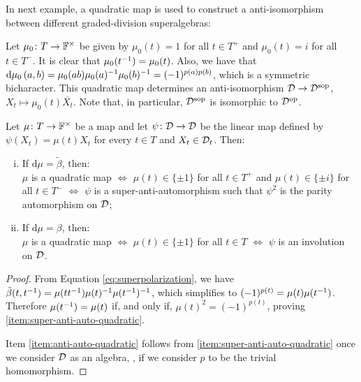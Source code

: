 In next example, a quadratic map is used to construct a anti-isomorphism between different graded-division superalgebras:

\begin{ex}\label{ex:quadratic-form-polarization-parity}
	Let $\mu_0\colon T \to \mathbb{F}^\times$ be given by $\mu_0(t) = 1$ for all $t\in T^+$ and $\mu_0(t) = i$ for all $t\in T^-$.
	It is clear that $\mu_0(t^{-1}) = \mu_0(t)$.
	Also, we have that $\mathrm{d}\mu_0 \, (a,b) = \mu_0(ab) \mu_0(a)^{-1} \mu_0(b)^{-1} = (-1)^{p(a)p(b)}$, which is a symmetric bicharacter. 
	This quadratic map determines an anti-isomorphism $\mathcal{D} \to \mathcal{D}^{\mathrm{sop}}$, $X_t\mapsto \mu_0(t)\overline{X_t}$. 
	Note that, in particular, $\mathcal{D}^{\mathrm{sop}}$ is isomorphic to $\mathcal{D}^{\mathrm{op}}$.
\end{ex}

\begin{lemma}\label{lemma:quadratic-form-involutions}
	Let $\mu\colon T \to \mathbb{F}^\times$ be a map and let $\psi\colon \mathcal{D} \to \mathcal{D}$ be the linear map defined by
	$\psi(X_t) = \mu(t) X_t$ for every $t\in T$ and $X_t \in \mathcal{D}_t$.
	Then:
	\begin{enumerate}[(i)]
		\item If $\mathrm{d}\mu = \tilde\beta$, then: \\
		      $\mu$ is a quadratic map $\iff$ $\mu(t)\in \{ \pm 1 \}$ for all $t \in T^+$ and $\mu(t)\in \{ \pm i \}$ for all $t \in T^-$ $\iff$ $\psi$ is a super-anti-automorphism such that $\psi^2$ is the parity automorphism on $\mathcal{D}$; \label{item:super-anti-auto-quadratic}
		\item If $\mathrm{d}\mu = \beta$, then:\\
		      $\mu$ is a quadratic map $\iff$ $\mu(t) \in \{\pm 1\}$ for all $t\in T$ $\iff$ $\psi$ is
		      an involution on $\mathcal{D}$. \label{item:anti-auto-quadratic}
	\end{enumerate}
\end{lemma}

\begin{proof}
	From Equation \eqref{eq:superpolarization}, we have $\tilde\beta (t, t^{-1}) = \mu (tt^{-1}) \mu(t)^{-1} \mu(t^{-1})^{-1}$, which simplifies to $(-1)^{p(t)} = \mu(t)\mu(t^{-1})$.
	Therefore $\mu(t^{-1}) = \mu(t)$ if, and only if, $\mu(t)^2 = (-1)^{p(t)}$, proving \eqref{item:super-anti-auto-quadratic}.

	Item \eqref{item:anti-auto-quadratic} follows from \eqref{item:super-anti-auto-quadratic} once we consider $\mathcal{D}$ as an algebra, \ie, if we consider $p$ to be the trivial homomorphism.
\end{proof}

